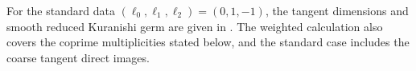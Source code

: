 \begin{remark}
\hypertarget{tag-PI11}{}\label{I:standard-deformation-credit}
For the standard data $(\ell_0,\ell_1,\ell_2)=(0,1,-1)$,
the tangent dimensions and smooth reduced Kuranishi germ are given in
\cite[Theorem~6.12, pp.~81--82; Proposition~6.16, p.~85]{DuEtAl2026v1}.
The weighted calculation
also covers the coprime multiplicities stated below, and the
standard case includes the coarse tangent direct images.
\end{remark}